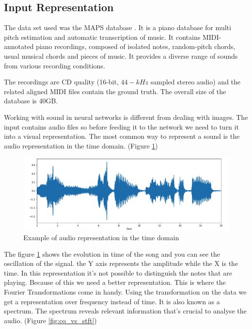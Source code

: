 \subsection{Input Representation}
The data set used was the MAPS database \cite{maps}. It is a piano database for multi pitch estimation and automatic transcription of music. It contains MIDI-annotated piano recordings, composed of isolated notes, random-pitch chords, usual musical chords and pieces of music. It provides a diverse range of sounds from various recording conditions.
\par
The recordings are CD quality (16-bit, $44-kHz$ sampled stereo audio) and the related aligned MIDI files contain the ground truth. The overall size of the database is 40GB. 
\par
Working with sound in neural networks is different from dealing with images. The input contains audio files so before feeding it to the network we need to turn it into a visual representation. The most common way to represent a sound is the audio representation in the time domain. (Figure \ref{fig:waveform})

\begin{figure}[h!]
	\caption[Example of audio representation in the time domain]{ Example of audio representation in the time domain \cite{genre_class} }
	\centering
	\label{fig:waveform}
	\includegraphics[width=1\textwidth, height=\textheight, keepaspectratio]{"resources/waveform"}
\end{figure}

The figure \ref{fig:waveform} shows the evolution in time of the song and you can see the oscillation of the signal. the Y axis represents the amplitude while the X is the time. In this representation it's not possible to distinguish the notes that are playing. Because of this we need a better representation. This is where the Fourier Transformations come in handy. Using the transformation on the data we get a representation over frequency instead of time. It is also known as a spectrum. The spectrum reveals relevant information that's crucial to analyse the audio. (Figure \ref{fig:cq_vs_stft})
\par

